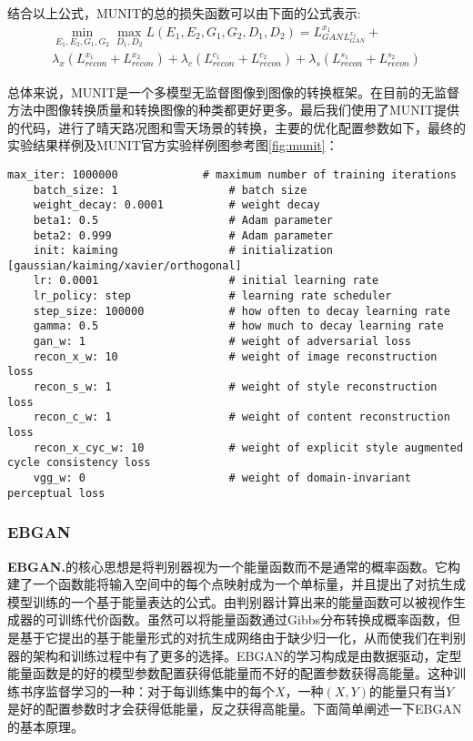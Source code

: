 结合以上公式，MUNIT的总的损失函数可以由下面的公式表示:
\begin{equation}
\begin{aligned}
    \min_{E_1,E_2,G_1,G_2}\max_{D_1,D_2}L(E_1,E_2,G_1,G_2,D_1,D_2)=L_{GAN}^{x_1}_L_{GAN}^{x_2}+\\
\lambda_x(L_{recon}^{x_1}+L_{recon}^{x_2})+\lambda_c(L_{recon}^{c_1}+L_{recon}^{c_2})+\lambda_s(L_{recon}^{s_1}+L_{recon}^{s_2})
\end{aligned}
\end{equation}

总体来说，MUNIT是一个多模型无监督图像到图像的转换框架。在目前的无监督方法中图像转换质量和转换图像的种类都更好更多。最后我们使用了MUNIT提供的代码，进行了晴天路况图和雪天场景的转换，主要的优化配置参数如下，最终的实验结果样例及MUNIT官方实验样例图参考图\ref{fig:munit}：

\begin{lstlisting}[basicstyle=\small, caption={MUNIT主要优化参数配置}, captionpos=b]
    max_iter: 1000000             # maximum number of training iterations
    batch_size: 1                 # batch size
    weight_decay: 0.0001          # weight decay
    beta1: 0.5                    # Adam parameter
    beta2: 0.999                  # Adam parameter
    init: kaiming                 # initialization [gaussian/kaiming/xavier/orthogonal]
    lr: 0.0001                    # initial learning rate
    lr_policy: step               # learning rate scheduler
    step_size: 100000             # how often to decay learning rate
    gamma: 0.5                    # how much to decay learning rate
    gan_w: 1                      # weight of adversarial loss
    recon_x_w: 10                 # weight of image reconstruction loss
    recon_s_w: 1                  # weight of style reconstruction loss
    recon_c_w: 1                  # weight of content reconstruction loss
    recon_x_cyc_w: 10             # weight of explicit style augmented cycle consistency loss
    vgg_w: 0                      # weight of domain-invariant perceptual loss
\end{lstlisting}

\subsubsection[EBGAN]{EBGAN}

\textbf{EBGAN.}\cite{ebgan}\quad 的核心思想是将判别器视为一个能量函数而不是通常的概率函数。它构建了一个函数能将输入空间中的每个点映射成为一个单标量，并且提出了对抗生成模型训练的一个基于能量表达的公式。由判别器计算出来的能量函数可以被视作生成器的可训练代价函数。虽然可以将能量函数通过Gibbs分布转换成概率函数，但是基于它提出的基于能量形式的对抗生成网络由于缺少归一化，从而使我们在判别器的架构和训练过程中有了更多的选择。EBGAN的学习构成是由数据驱动，定型能量函数是的好的模型参数配置获得低能量而不好的配置参数获得高能量。这种训练书序监督学习的一种：对于每训练集中的每个$X$，一种$(X,Y)$的能量只有当$Y$是好的配置参数时才会获得低能量，反之获得高能量。下面简单阐述一下EBGAN的基本原理。

